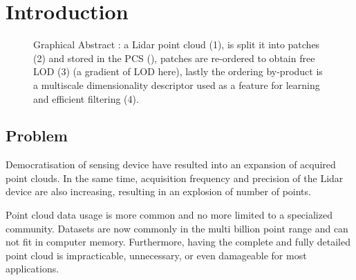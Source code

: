 


\section{Introduction}

\begin{figure}[t!]
	\begin{center}
		\caption{Graphical Abstract : a Lidar point cloud (1), is split it into patches (2) 
		and stored in the PCS (\cite{Cura2015}), patches are re-ordered to obtain free LOD 
		(3) (a gradient of LOD here), lastly the ordering by-product is a multiscale dimensionality descriptor used as a feature for learning and efficient filtering (4).} 
		\label{lod.fig:banner_image}
	\end{center}
\end{figure} 

\subsection{Problem}   
	Democratisation of sensing device have resulted into an expansion of acquired point clouds.
	In the same time, acquisition frequency and precision of the Lidar device are also increasing,
	resulting in an explosion of number of points.
	
	Point cloud data usage is more common and no more limited to a specialized community.
	Datasets are now commonly in the multi billion point range and can not fit in computer memory.
	Furthermore, having the complete and fully detailed point cloud is impracticable, unnecessary, or even damageable for most applications.
 
